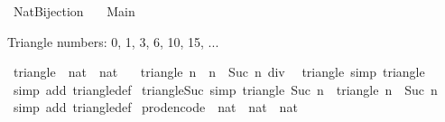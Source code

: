 %
\begin{isabellebody}%
%
%
\isadelimdocument
%
\endisadelimdocument
%
\isatagdocument
%
\isamarkuptrue%
%
\endisatagdocument
{\isafolddocument}%
%
\isadelimdocument
%
\endisadelimdocument
%
\isadelimtheory
%
\endisadelimtheory
%
\isatagtheory
{}\isamarkupfalse%
\ Nat{\isacharunderscore}Bijection\isanewline
\ \ \ Main\isanewline
{}%
\endisatagtheory
{\isafoldtheory}%
%
\isadelimtheory
%
\endisadelimtheory
%
\isadelimdocument
%
\endisadelimdocument
%
\isatagdocument
%
\isamarkuptrue%
%
\endisatagdocument
{\isafolddocument}%
%
\isadelimdocument
%
\endisadelimdocument
%
\begin{isamarkuptext}%
Triangle numbers: 0, 1, 3, 6, 10, 15, ...%
\end{isamarkuptext}\isamarkuptrue%
\isamarkupfalse%
\ triangle\ {\isacharcolon}{\isacharcolon}\ {\isachardoublequoteopen}nat\ {\isasymRightarrow}\ nat{\isachardoublequoteclose}\isanewline
\ \ \ {\isachardoublequoteopen}triangle\ n\ {\isacharequal}\ {\isacharparenleft}n\ {\isacharasterisk}\ Suc\ n{\isacharparenright}\ div\ {}{\isachardoublequoteclose}\isanewline
\isanewline
{}\isamarkupfalse%
\ triangle{\isacharunderscore}{}\ {\isacharbrackleft}simp{\isacharbrackright}{\isacharcolon}\ {\isachardoublequoteopen}triangle\ {}\ {\isacharequal}\ {}{\isachardoublequoteclose}\isanewline
%
\isadelimproof
\ \ %
\endisadelimproof
%
\isatagproof
{}\isamarkupfalse%
\ {\isacharparenleft}simp\ add{\isacharcolon}\ triangle{\isacharunderscore}def{\isacharparenright}%
\endisatagproof
{\isafoldproof}%
%
\isadelimproof
\isanewline
%
\endisadelimproof
\isanewline
{}\isamarkupfalse%
\ triangle{\isacharunderscore}Suc\ {\isacharbrackleft}simp{\isacharbrackright}{\isacharcolon}\ {\isachardoublequoteopen}triangle\ {\isacharparenleft}Suc\ n{\isacharparenright}\ {\isacharequal}\ triangle\ n\ {\isacharplus}\ Suc\ n{\isachardoublequoteclose}\isanewline
%
\isadelimproof
\ \ %
\endisadelimproof
%
\isatagproof
{}\isamarkupfalse%
\ {\isacharparenleft}simp\ add{\isacharcolon}\ triangle{\isacharunderscore}def{\isacharparenright}%
\endisatagproof
{\isafoldproof}%
%
\isadelimproof
\isanewline
%
\endisadelimproof
\isanewline
{}\isamarkupfalse%
\ prod{\isacharunderscore}encode\ {\isacharcolon}{\isacharcolon}\ {\isachardoublequoteopen}nat\ {\isasymtimes}\ nat\ {\isasymRightarrow}\ nat{\isachardoublequoteclose}\isanewline

\end{isabellebody}
